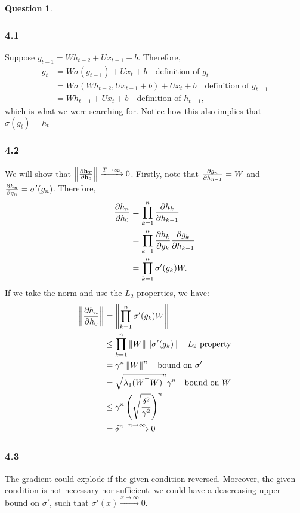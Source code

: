 \documentclass[12pt]{article}
\theoremstyle{definition}
\newtheorem{exercise}{Question}%
\begin{document}
\begin{exercise}
{    \subsubsection*{4.1}
    Suppose $g_{t-1} = W h _{t-2} +U x_{t-1} + b$. Therefore,
    \begin{align*}
    g_{t}   &= W \sigma(g_{t-1}) + U x_{t} + b \quad \text{definition of $g_{t}$}\\
           &= W \sigma(W h_{t-2} , U x_{t-1} + b) + U x_{t} + b \quad  \text{definition
             of $g_{t-1}$}\\
           &= W h_{t-1} + U x_{t} + b \quad \text{definition of $h_{t-1}$},
    \end{align*}which is what we were searching for. Notice how this also
    implies that $\sigma(g_{t})= h_{t}$
    \subsubsection*{4.2}
    We will show that
    $\left\Vert \frac{\partial \mathbf{h}_{T}}{\partial \mathbf{h}_{0}} \right\Vert \xrightarrow{T\to \infty}0$.
    Firstly, note that $\frac{\partial g_{n}}{\partial h_{n-1}} = W $ and
    $\frac{\partial h_{n}}{\partial g_{n}} = \sigma'(g_{n})$. Therefore,
    \begin{align*}
      \frac{\partial h_{n}}{\partial h_{0}} &= \prod_{k = 1}^{n} \frac{\partial h_{k}}{\partial h_{k-1}}\\
      &= \prod_{k =1}^{n} \frac{\partial h_{k}}{\partial g_{k}} \frac{\partial g_{k}}{\partial h_{k-1}} \\
      &= \prod_{k=1}^{n}  \sigma'(g_{k})W.
    \end{align*}
    If we take the norm and use the $L_{2}$ properties, we have:
    \begin{align*}
      \left\Vert \frac{\partial h_{n}}{\partial h_{0}} \right\Vert &= \left\Vert \prod_{k=1}^{n}  \sigma'(g_{k})W \right\Vert\\
                               &\leq \prod_{k =1}^{n} \left\Vert W \right\Vert \left\Vert \sigma'(g_{k}) \right\Vert \quad \text{$L_{2}$ property}\\
                               &= \gamma^{n} \left\Vert W \right\Vert^{n} \quad \text{bound on $\sigma'$}\\
                               &= \sqrt{\lambda_{1}(W^{\top}W)}^{n}\gamma^{n}\quad \text{bound
                                 on $W$}\\
                               & \leq \gamma^{n} \left( \sqrt{\frac{\delta^{2}}{\gamma^{2}}} \right)^{n}\\
                               &= \delta^{n} \xrightarrow{n \to \infty}0
    \end{align*}
    \subsubsection*{4.3}
    The gradient could explode if the given condition reversed.  Moreover, the
    given condition is not necessary nor sufficient: we could have a deacreasing
    upper bound on $\sigma'$, such that $\sigma'(x) \xrightarrow{x \to \infty} 0$.
}
\end{exercise}
\end{document}
